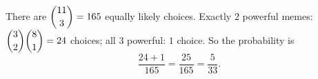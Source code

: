 There are $\dbinom{11}{3}=165$ equally likely choices. Exactly $2$ powerful memes: $\dbinom32\dbinom81=24$ choices; all $3$ powerful: $1$ choice. So the probability is
\[\dfrac{24+1}{165}=\dfrac{25}{165}=\boxed{\dfrac{5}{33}}.\]
